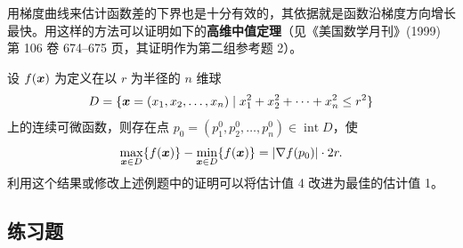 \begin{xremark}
用梯度曲线来估计函数差的下界也是十分有效的，其依据就是函数沿梯度方向增长最快。用这样的方法可以证明如下的\textbf{高维中值定理}（见《美国数学月刊》(1999) 第 106 卷 674--675 页，其证明作为第二组参考题 2）。

设 $f(\bm{x})$ 为定义在以 $r$ 为半径的 $n$ 维球
\[
  D=\{\bm{x}=(x_1,x_2,\ldots,x_n)\mid x_1^2+x_2^2+\cdots+x_n^2\le r^2\}
\]
上的连续可微函数，则存在点 $p_0=(p_1^0,p_2^0,\ldots,p_n^0)\in\operatorname{int}D$，使
\[
  \max_{\bm{x}\in D}\{f(\bm{x})\}-\min_{\bm{x}\in D}\{f(\bm{x})\}=\lvert\nabla f(p_0)\rvert\cdot2r.
\]
利用这个结果或修改上述例题中的证明可以将估计值 4 改进为最佳的估计值 1。
\end{xremark}

\subsection{练习题}

